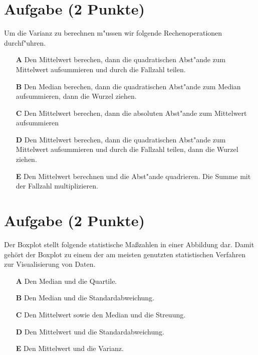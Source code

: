 \documentclass[a4paper, 9pt]{scrartcl}\usepackage[]{graphicx}\usepackage[]{xcolor}
\begin{document}
\section{Aufgabe \hfill (2 Punkte)}



Um die Varianz zu berechnen m{"u}ssen wir folgende Rechenoperationen durchf{"u}hren.



\begin{enumerate}
\item [\textbf{A} \msquare] Den Mittelwert berechen, dann die quadratischen Abst{"a}nde zum Mittelwert aufsummieren und durch die Fallzahl teilen.
\item [\textbf{B} \msquare] Den Median berechen, dann die quadratischen Abst{"a}nde zum Median aufsummieren, dann die Wurzel ziehen.
\item [\textbf{C} \msquare] Den Mittelwert berechen, dann die absoluten Abst{"a}nde zum Mittelwert aufsummieren
\item [\textbf{D} \msquare] Den Mittelwert berechen, dann die quadratischen Abst{"a}nde zum Mittelwert aufsummieren und durch die Fallzahl teilen, dann die Wurzel ziehen.
\item [\textbf{E} \msquare] Den Mittelwert berechnen und die Abst{"a}nde quadrieren. Die Summe mit der Fallzahl multiplizieren.
\end{enumerate}

\section{Aufgabe \hfill (2 Punkte)}



Der Boxplot stellt folgende statistische Ma{\ss}zahlen in einer
Abbildung dar. Damit geh{\"o}rt der Boxplot zu einem der am meisten
genutzten statistischen Verfahren zur Visualisierung von Daten. 



\begin{enumerate}
\item [\textbf{A} \msquare] Den Median und die Quartile.
\item [\textbf{B} \msquare] Den Median und die Standardabweichung.
\item [\textbf{C} \msquare] Den Mittelwert sowie den Median und die Streuung.
\item [\textbf{D} \msquare] Den Mittelwert und die Standardabweichung.
\item [\textbf{E} \msquare] Den Mittelwert und die Varianz.
\end{enumerate} 
\end{document}
